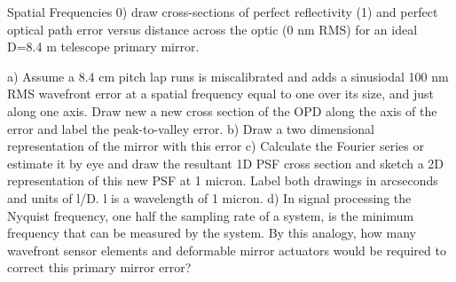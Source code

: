 \begin{frame}{Spatial Frequencies}
0) draw cross-sections of perfect reflectivity  (1) and perfect optical path error versus distance across the optic (0 nm RMS) for an ideal D=8.4 m telescope primary mirror.

a)	Assume a 8.4 cm pitch lap runs is miscalibrated and adds a sinusiodal 100 nm RMS wavefront error at a spatial frequency equal to one over its size, and just along one axis. Draw new a new cross section of the OPD along the axis of the error and label the peak-to-valley error.
b)	Draw a two dimensional representation of the mirror with this error
c)	Calculate the Fourier series or estimate it by eye and draw the resultant 1D PSF cross section and sketch a 2D representation of this new PSF at 1 micron. Label both drawings in arcseconds and units of l/D. l is a wavelength of 1 micron.
d)	In signal processing the Nyquist frequency, one half the sampling rate of a system, is the minimum frequency that can be measured by the system. By this analogy, how many wavefront sensor elements and deformable mirror actuators would be required to correct this primary mirror error?
\end{frame}
\begin{frame}{}
\end{frame}
